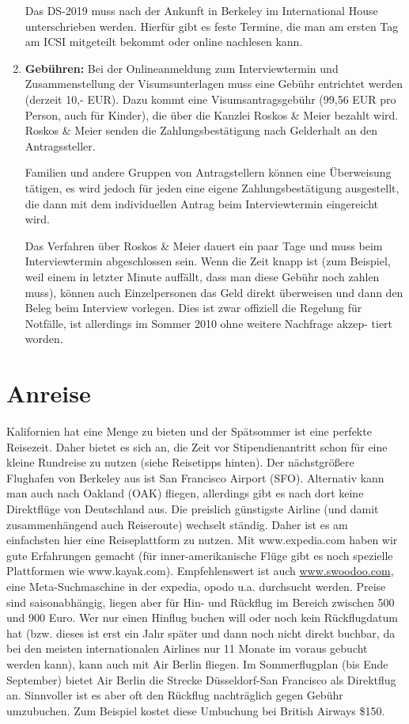 \documentclass[a4paper]{scrreprt}
\begin{document}
\begin{enumerate}
	Das DS-2019 muss nach der Ankunft in Berkeley im International House unterschrieben werden. Hierfür gibt es feste Termine, die man am ersten Tag am ICSI mitgeteilt bekommt oder online nachlesen kann.

	\item \textbf{Gebühren:} Bei der Onlineanmeldung zum Interviewtermin und Zusammenstellung der Visumsunterlagen muss eine Gebühr entrichtet werden (derzeit 10,- EUR). Dazu kommt eine Visumsantragsgebühr (99,56 EUR pro Person, auch für Kinder), die über die Kanzlei Roskos \& Meier bezahlt wird. Roskos \& Meier senden die Zahlungsbestätigung nach Gelderhalt an den Antragssteller.

	Familien und andere Gruppen von Antragstellern können eine Überweisung tätigen, es wird jedoch für jeden eine eigene Zahlungsbestätigung ausgestellt, die dann mit dem individuellen Antrag beim Interviewtermin eingereicht wird.
	
	Das Verfahren über Roskos \& Meier dauert ein paar Tage und muss beim Interviewtermin abgeschlossen sein. Wenn die Zeit knapp ist (zum Beispiel, weil einem in letzter Minute auffällt, dass man diese Gebühr noch zahlen muss), können auch Einzelpersonen das Geld direkt überweisen und dann den Beleg beim Interview vorlegen. Dies ist zwar offiziell die Regelung für Notfälle, ist allerdings im Sommer 2010 ohne weitere Nachfrage akzep- tiert worden.
	
\end{enumerate}

\section{Anreise}

Kalifornien hat eine Menge zu bieten und der Spätsommer ist eine perfekte Reisezeit. Daher bietet es sich an, die Zeit vor Stipendienantritt schon für eine kleine Rundreise zu nutzen (siehe Reisetipps hinten). Der nächstgrößere Flughafen von Berkeley aus ist San Francisco Airport (SFO). Alternativ kann man auch nach Oakland (OAK) fliegen, allerdings gibt es nach dort keine Direktflüge von Deutschland aus. Die preislich günstigste Airline (und damit zusammenhängend auch Reiseroute) wechselt ständig. Daher ist es am einfachsten hier eine Reiseplattform zu nutzen. Mit www.expedia.com haben wir gute Erfahrungen gemacht (für inner-amerikanische Flüge gibt es noch spezielle Plattformen wie  www.kayak.com). Empfehlenswert ist auch  \url{www.swoodoo.com}, eine Meta-Suchmaschine in der expedia, opodo u.a. durchsucht werden. Preise sind saisonabhängig, liegen aber für Hin- und Rückflug im Bereich zwischen 500 und 900 Euro. Wer nur einen Hinflug buchen will oder noch kein Rückflugdatum hat (bzw. dieses ist erst ein Jahr später und dann noch nicht direkt buchbar, da bei den meisten internationalen Airlines nur 11 Monate im voraus gebucht werden kann), kann auch mit Air Berlin fliegen. Im Sommerflugplan (bis Ende September) bietet Air Berlin die Strecke Düsseldorf-San Francisco als Direktflug an. Sinnvoller ist es aber oft den Rückflug nachträglich gegen Gebühr umzubuchen. Zum Beispiel kostet diese Umbuchung bei British Airways \$150. 
\end{document}
